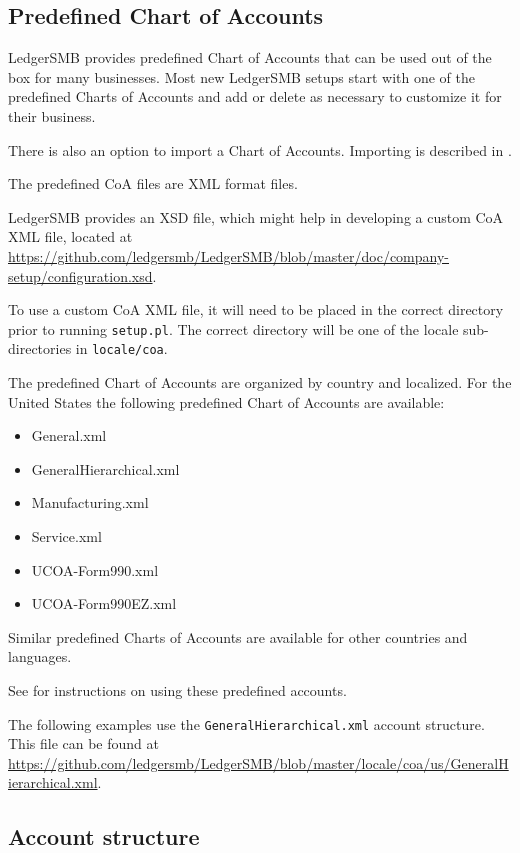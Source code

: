 \subsection{Predefined Chart of Accounts}
\label{sec-coa-predefined}

LedgerSMB provides predefined Chart of Accounts that can be used out of the box for many businesses.
Most new LedgerSMB setups start with one of the predefined Charts of Accounts and add or delete as necessary to customize it for their business.

There is also an option to import a Chart of Accounts. Importing is described in .

The predefined \gls{CoA} files are \gls{XML} format files.

LedgerSMB provides an \gls{XSD} file, which might help in developing a custom CoA XML file,  located at \url{https://github.com/ledgersmb/LedgerSMB/blob/master/doc/company-setup/configuration.xsd}.  

To use a custom \gls{CoA} \gls{XML} file, it will need to be placed in the correct directory prior to running \texttt{setup.pl}. The correct directory will be one of the locale sub-directories in \texttt{locale/coa}.

The predefined Chart of Accounts are organized by country and localized. For the United States the following predefined Chart of Accounts are available:
\begin{itemize}
    \item General.xml
    \item GeneralHierarchical.xml
    \item Manufacturing.xml
    \item Service.xml
    \item UCOA-Form990.xml
    \item UCOA-Form990EZ.xml
\end{itemize}

Similar predefined Charts of Accounts are available for other countries and languages.

See  for instructions on using these predefined accounts.

The following examples use the \texttt{GeneralHierarchical.xml} account structure.
This file can be found at \url{https://github.com/ledgersmb/LedgerSMB/blob/master/locale/coa/us/GeneralHierarchical.xml}.

\subsection{Account structure}
\label{sec-coa-accounts-structure}


